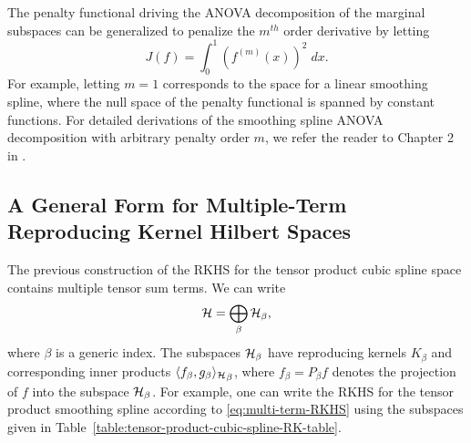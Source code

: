 The penalty functional driving the ANOVA decomposition of the marginal subspaces can be generalized to penalize the $m^{th}$ order derivative by letting
\[
J\left(f\right) = \int_0^1  \left(f^{\left(m\right)}\left(x\right)\right)^2\;dx.
\]
\noindent
For example, letting $m = 1$ corresponds to the space for a linear smoothing spline, where the null space of the penalty functional is spanned by constant functions. For detailed derivations of the smoothing spline ANOVA decomposition with arbitrary penalty order $m$, we refer the reader to Chapter 2 in \cite{gu2013smoothing}. 


\subsection{A General Form for Multiple-Term Reproducing Kernel Hilbert Spaces}

The previous construction of the RKHS for the tensor product cubic spline space contains multiple tensor sum terms. We can write 
\begin{equation} \label{eq:multi-term-RKHS}
\mathcal{H} = \bigoplus\limits_{\beta} \mathcal{H}_\beta, 
\end{equation}
\noindent
where $\beta$ is a generic index. The subspaces $\mathcal{H}_\beta$ have reproducing kernels $K_\beta$ and corresponding inner products $\langle f_\beta,g_\beta {\rangle_{\mathcal{H}}}_\beta$, where $f_\beta = P_\beta f$ denotes the projection of $f$ into the subspace $\mathcal{H}_\beta$.  For example, one can write the RKHS for the tensor product smoothing spline according to \eqref{eq:multi-term-RKHS} using the subspaces given in Table~\ref{table:tensor-product-cubic-spline-RK-table}. 

\bigskip

